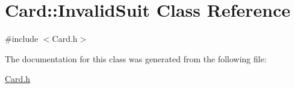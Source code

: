 \hypertarget{class_card_1_1_invalid_suit}{}\section{Card\+:\+:Invalid\+Suit Class Reference}
\label{class_card_1_1_invalid_suit}


{\ttfamily \#include $<$Card.\+h$>$}



The documentation for this class was generated from the following file\+:\begin{DoxyCompactItemize}
\item 
\mbox{\hyperlink{_card_8h}{Card.\+h}}\end{DoxyCompactItemize}
